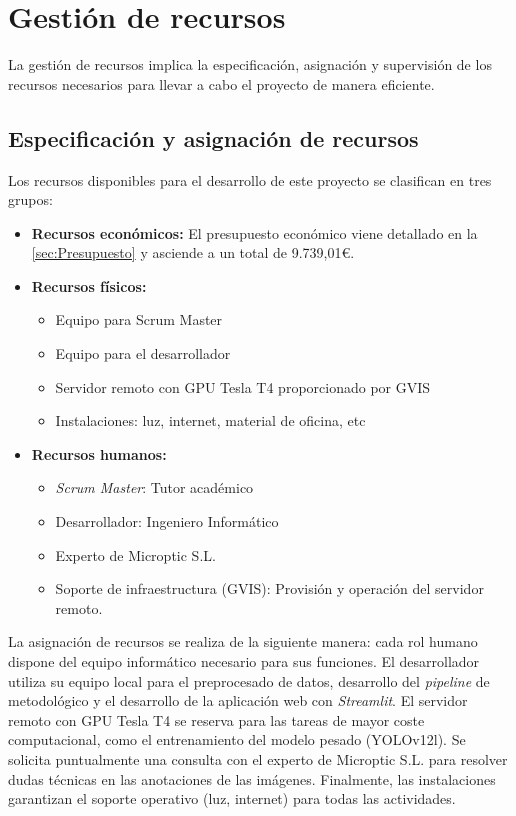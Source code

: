 \documentclass[12pt,a4paper,onecolumn,oneside]{report}
\begin{document}
\section{Gestión de recursos}
\label{Gestión de recursos}

La gestión de recursos implica la especificación, asignación y supervisión de los recursos necesarios para llevar a cabo el proyecto de manera eficiente.

\subsection{Especificación y asignación de recursos}
\label{Especificación y asignación de recursos}

Los recursos disponibles para el desarrollo de este proyecto se clasifican en tres grupos:

\begin{itemize}
  \item \textbf{Recursos económicos:} El presupuesto económico viene detallado en la \autoref{sec:Presupuesto} y asciende a un total de 9.739,01\euro{}.
  \item \textbf{Recursos físicos:}
    \begin{itemize}[label=-]
      \item Equipo para Scrum Master
      \item Equipo para el desarrollador
      \item Servidor remoto con GPU Tesla T4 proporcionado por GVIS
      \item Instalaciones: luz, internet, material de oficina, etc
    \end{itemize}
  \item \textbf{Recursos humanos:} 
    \begin{itemize}[label=-]
      \item \textit{Scrum Master}: Tutor académico
      \item Desarrollador: Ingeniero Informático
      \item Experto de Microptic S.L.
      \item Soporte de infraestructura (GVIS): Provisión y operación del servidor remoto.
    \end{itemize}
\end{itemize}

La asignación de recursos se realiza de la siguiente manera: cada rol humano dispone del equipo informático necesario para sus 
funciones. El desarrollador utiliza su equipo local para el preprocesado de datos, desarrollo del \textit{pipeline} de metodológico y el desarrollo de la aplicación web con \textit{Streamlit}. 
El servidor remoto con GPU Tesla T4 se reserva para las tareas de mayor coste computacional, como el entrenamiento del modelo pesado (YOLOv12l).
Se solicita puntualmente una consulta con el experto de Microptic S.L. para resolver dudas técnicas en las anotaciones de las imágenes.
Finalmente, las instalaciones garantizan el soporte operativo (luz, internet) para todas las actividades.
\end{document}
